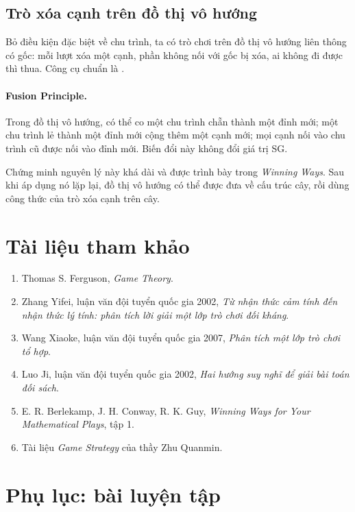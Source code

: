 \documentclass[11pt]{article}
\begin{document}
\subsection{Trò xóa cạnh trên đồ thị vô hướng}

Bỏ điều kiện đặc biệt về chu trình, ta có trò chơi trên đồ thị vô hướng liên
thông có gốc: mỗi lượt xóa một cạnh, phần không nối với gốc bị xóa, ai không
đi được thì thua. Công cụ chuẩn là .

\paragraph{Fusion Principle.}
Trong đồ thị vô hướng, có thể co một chu trình chẵn thành một đỉnh mới; một
chu trình lẻ thành một đỉnh mới cộng thêm một cạnh mới; mọi cạnh nối vào chu
trình cũ được nối vào đỉnh mới. Biến đổi này không đổi giá trị SG.

Chứng minh nguyên lý này khá dài và được trình bày trong \textit{Winning Ways}.
Sau khi áp dụng nó lặp lại, đồ thị vô hướng có thể được đưa về cấu trúc cây,
rồi dùng công thức của trò xóa cạnh trên cây.

\section{Tài liệu tham khảo}

\begin{enumerate}
  \item Thomas S. Ferguson, \textit{Game Theory}.
  \item Zhang Yifei, luận văn đội tuyển quốc gia 2002,
  \textit{Từ nhận thức cảm tính đến nhận thức lý tính: phân tích lời giải một
  lớp trò chơi đối kháng}.
  \item Wang Xiaoke, luận văn đội tuyển quốc gia 2007,
  \textit{Phân tích một lớp trò chơi tổ hợp}.
  \item Luo Ji, luận văn đội tuyển quốc gia 2002,
  \textit{Hai hướng suy nghĩ để giải bài toán đối sách}.
  \item E. R. Berlekamp, J. H. Conway, R. K. Guy,
  \textit{Winning Ways for Your Mathematical Plays}, tập 1.
  \item Tài liệu \textit{Game Strategy} của thầy Zhu Quanmin.
\end{enumerate}

\section{Phụ lục: bài luyện tập}
\end{document}
